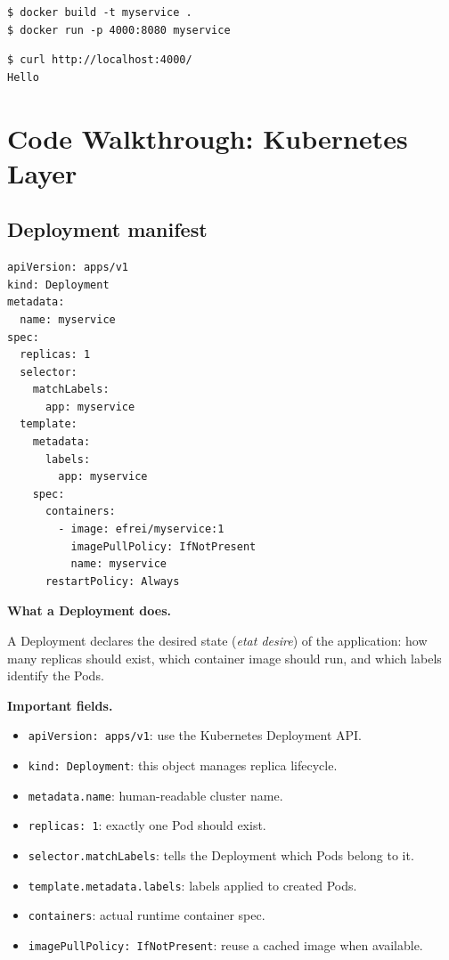\documentclass[a4paper,11pt]{article}
\begin{document}
\begin{lstlisting}[style=terminal, caption={Build and run flow}]
$ docker build -t myservice .
$ docker run -p 4000:8080 myservice
\end{lstlisting}

\begin{lstlisting}[style=terminal, caption={Visible result}]
$ curl http://localhost:4000/
Hello
\end{lstlisting}

\section{Code Walkthrough: Kubernetes Layer}

\subsection{Deployment manifest}

\begin{lstlisting}[style=code, caption={myservice-deployment.yml}]
apiVersion: apps/v1
kind: Deployment
metadata:
  name: myservice
spec:
  replicas: 1
  selector:
    matchLabels:
      app: myservice
  template:
    metadata:
      labels:
        app: myservice
    spec:
      containers:
        - image: efrei/myservice:1
          imagePullPolicy: IfNotPresent
          name: myservice
      restartPolicy: Always
\end{lstlisting}

\textbf{What a Deployment does.}

A Deployment declares the desired state (\emph{etat desire}) of the application: how many replicas should exist, which container image should run, and which labels identify the Pods.

\textbf{Important fields.}

\begin{itemize}
  \item \texttt{apiVersion: apps/v1}: use the Kubernetes Deployment API.
  \item \texttt{kind: Deployment}: this object manages replica lifecycle.
  \item \texttt{metadata.name}: human-readable cluster name.
  \item \texttt{replicas: 1}: exactly one Pod should exist.
  \item \texttt{selector.matchLabels}: tells the Deployment which Pods belong to it.
  \item \texttt{template.metadata.labels}: labels applied to created Pods.
  \item \texttt{containers}: actual runtime container spec.
  \item \texttt{imagePullPolicy: IfNotPresent}: reuse a cached image when available.
\end{itemize}
\end{document}
